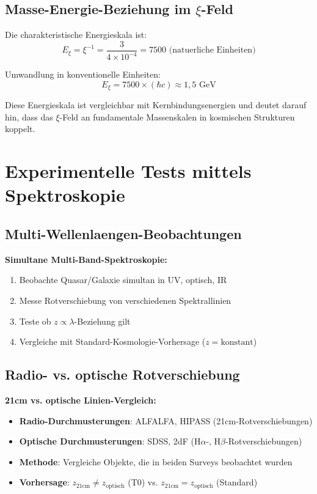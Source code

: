 \documentclass[12pt,a4paper]{article}
\newcommand{\Exi}{E_\xi}
\theoremstyle{definition}
\begin{document}
	\subsection{Masse-Energie-Beziehung im $\xi$-Feld}
	
	Die charakteristische Energieskala ist:
	\begin{equation}
		\Exi = \xi^{-1} = \frac{3}{4 \times 10^{-4}} = 7500 \text{ (natuerliche Einheiten)}
	\end{equation}
	
	Umwandlung in konventionelle Einheiten:
	\begin{equation}
		\Exi = 7500 \times (\hbar c) \approx 1,5 \text{ GeV}
	\end{equation}
	
	Diese Energieskala ist vergleichbar mit Kernbindungsenergien und deutet darauf hin, dass das $\xi$-Feld an fundamentale Massenskalen in kosmischen Strukturen koppelt.
	
	\section{Experimentelle Tests mittels Spektroskopie}
	
	\subsection{Multi-Wellenlaengen-Beobachtungen}
	
	\begin{experiment}
		\textbf{Simultane Multi-Band-Spektroskopie:}
		\begin{enumerate}
			\item Beobachte Quasar/Galaxie simultan in UV, optisch, IR
			\item Messe Rotverschiebung von verschiedenen Spektrallinien
			\item Teste ob $z \propto \lambda$-Beziehung gilt
			\item Vergleiche mit Standard-Kosmologie-Vorhersage ($z = \text{konstant}$)
		\end{enumerate}
	\end{experiment}
	
	\subsection{Radio- vs. optische Rotverschiebung}
	
	\begin{experiment}
		\textbf{21cm vs. optische Linien-Vergleich:}
		\begin{itemize}
			\item \textbf{Radio-Durchmusterungen}: ALFALFA, HIPASS (21cm-Rotverschiebungen)
			\item \textbf{Optische Durchmusterungen}: SDSS, 2dF (H$\alpha$-, H$\beta$-Rotverschiebungen)
			\item \textbf{Methode}: Vergleiche Objekte, die in beiden Surveys beobachtet wurden
			\item \textbf{Vorhersage}: $z_{21\text{cm}} \neq z_{\text{optisch}}$ (T0) vs. $z_{21\text{cm}} = z_{\text{optisch}}$ (Standard)
		\end{itemize}
	\end{experiment}
	
\end{document}

